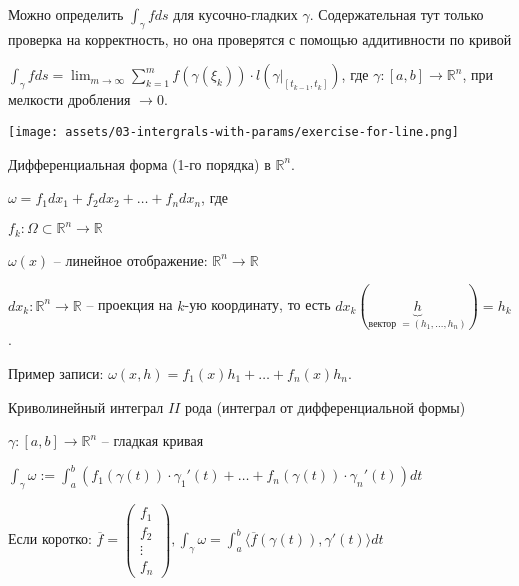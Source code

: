 \begin{remark}
    Можно определить $\int_{\gamma}^{}f ds$ для кусочно-гладких $\gamma$. Содержательная тут только проверка на корректность, но она проверятся с помощью аддитивности по кривой 
\end{remark}

\begin{exerc}

    $\int_{\gamma}^{}f ds = \lim_{m \rightarrow \infty} \sum_{k = 1}^{m}f(\gamma(\xi_k)) \cdot l(\gamma|_{[t_{k - 1}, t_k]})$, где $\gamma: [a, b] \to \mathbb{R}^n$, при мелкости дробления $\to 0$.

    \begin{center}
        \texttt{[image: assets/03-intergrals-with-params/exercise-for-line.png]}
    \end{center}
\end{exerc}

\begin{definition}
    Дифференциальная форма (1-го порядка) в $\mathbb{R}^n$.

    $\omega = f_1dx_1 + f_2dx_2 + \dots + f_ndx_n$, где

    $f_k: \Omega \subset \mathbb{R}^n \rightarrow \mathbb{R}$

    $\omega(x)$ -- линейное отображение: $\mathbb{R}^n \rightarrow \mathbb{R}$

    $dx_k: \mathbb{R}^n \rightarrow \mathbb{R}$ -- проекция на $k$-ую координату, то есть $dx_k(\underbrace{h}_{\text{вектор } = (h_1, \dots, h_n)}) = h_k$.

    Пример записи: $\omega(x, h) = f_1(x) h_1 + \dots + f_n(x) h_n$.
\end{definition}

\begin{definition}
    Криволинейный интеграл $II$ рода (интеграл от дифференциальной формы)

    $\gamma: [a, b] \to \mathbb{R}^n$ -- гладкая кривая

    $\int_{\gamma}^{}\omega := \int_{a}^{b}(f_1(\gamma(t))\cdot\gamma_1'(t) + \dots + f_n(\gamma(t))\cdot\gamma_n'(t))dt$

    Если коротко: $\overline{f} = \begin{pmatrix}
        f_1\\
        f_2\\
        \vdots\\
        f_n
    \end{pmatrix}, \int_{\gamma}^{}\omega = \int_{a}^{b}\langle \overline{f}(\gamma(t)), \gamma'(t)\rangle dt$
\end{definition}

